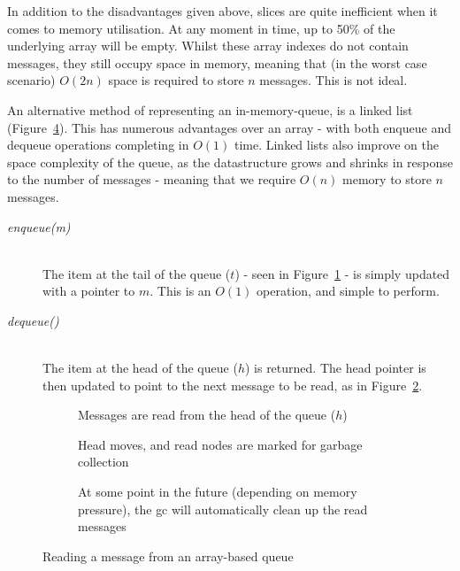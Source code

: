 In addition to the disadvantages given above, slices are quite inefficient when
it comes to memory utilisation. At any moment in time, up to 50\% of the
underlying array will be empty. Whilst these array indexes do not contain
messages, they still occupy space in memory, meaning that (in the worst case
scenario) $O(2n)$ space is required to store $n$ messages. This is not ideal.

An alternative method of representing an in-memory-queue, is a linked list
(Figure~\ref{fig:tikz:queueLinkedList}). This has numerous advantages over an
array - with both enqueue and dequeue operations completing in $O(1)$ time.
Linked lists also improve on the space complexity of the queue, as the
datastructure grows and shrinks in response  to the number of messages - meaning
that we require $O(n)$ memory to store $n$ messages.

\begin{description}
  \item[\textit{enqueue(m)}] \hfill \\
    The item at the tail of the queue ($t$) - seen in
    Figure~\ref{fig:tikz:queueLinkedListInitial} - is simply updated with a
    pointer to $m$. This is an $O(1)$ operation, and simple to perform.
  \item[\textit{dequeue()}] \hfill \\
    The item at the head of the queue ($h$) is returned. The head pointer is
    then updated to point to the next message to be read, as in
    Figure~\ref{fig:tikz:queueLinkedListHeadRead}.
\end{description}

\begin{figure}[H]
  \centering
  \begin{subfigure}[b]{\textwidth}
    \centering
    
    \caption{Messages are read from the head of the queue ($h$)}
    \label{fig:tikz:queueLinkedListInitial}
  \end{subfigure}

  \begin{subfigure}[b]{\textwidth}
    \centering
    
    \caption{Head moves, and read nodes are marked for garbage collection}
    \label{fig:tikz:queueLinkedListHeadRead}
  \end{subfigure}

  \begin{subfigure}[b]{\textwidth}
    \centering
    
    \caption{At some point in the future (depending on memory pressure), the
             \gls{gc} will automatically clean up the read messages}
    \label{fig:tikz:queueLinkedListGCRun}
  \end{subfigure}
  \caption{Reading a message from an array-based queue}
  \label{fig:tikz:queueLinkedList}
\end{figure}

